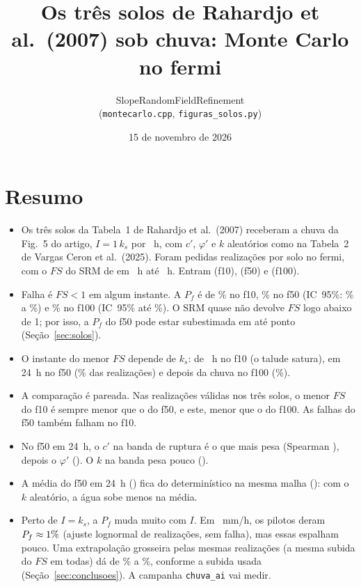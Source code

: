 \documentclass[11pt,a4paper]{article}
\author{SlopeRandomFieldRefinement\\ \small(\texttt{montecarlo.cpp}, \texttt{figuras\_solos.py})}
\title{Os três solos de Rahardjo et al.\ (2007) sob chuva: Monte Carlo no fermi}
\date{15 de novembro de 2026}
\begin{document}
\maketitle

\section*{Resumo}
\begin{itemize}
\item Os três solos da Tabela~1 de Rahardjo et al.\ (2007) receberam a chuva da Fig.~5 do artigo, $I = 1\,k_s$ por
\Chuva~h, com $c'$, $\varphi'$ e $k$ aleatórios como na Tabela~2 de Vargas Ceron et al.\ (2025). Foram pedidas
\NPlanDez{} realizações por solo no fermi, com o $FS$ do SRM de \Passo{} em \Passo~h até \Fim~h. Entram \NDez{} (f10),
\NCinquenta{} (f50) e \NCem{} (f100).
\item Falha é $FS < 1$ em algum instante. A $P_f$ é de \PfMinDez\% no f10, \PfMinCinquenta\% no f50 (IC~95\%:
\LoMinCinquenta\% a \HiMinCinquenta\%) e \PfMinCem\% no f100 (IC~95\% até \HiMinCem\%). O SRM quase não devolve $FS$
logo abaixo de 1; por isso, a $P_f$ do f50 pode estar subestimada em até \BuracoPontos{} ponto (Seção~\ref{sec:solos}).
\item O instante do menor $FS$ depende de $k_s$: de \QuandoFaixaDez~h no f10 (o talude satura), em 24~h no f50
(\QuandoPctCinquentaVinteQuatro\% das realizações) e depois da chuva no f100 (\DepoisPctCem\%).
\item A comparação é pareada. Nas \NComuns{} realizações válidas nos três solos, o menor $FS$ do f10 é sempre menor
que o do f50, e este, menor que o do f100. As \NfComunsCinquenta{} falhas do f50 também falham no f10.
\item No f50 em 24~h, o $c'$ na banda de ruptura é o que mais pesa (Spearman \RhoC), depois o $\varphi'$ (\RhoPhi). O
$k$ na banda pesa pouco (\RhoK).
\item A média do f50 em 24~h (\MediaCinquentaVinteQuatro) fica \PosCinquentaVinteQuatro{} do determinístico na mesma
malha (\DetCinquentaVinteQuatro): com o $k$ aleatório, a água sobe menos na média.
\item Perto de $I = k_s$, a $P_f$ muda muito com $I$. Em \Iref~mm/h, os pilotos deram $P_f \approx 1\%$
(ajuste lognormal de \NPiloto{} realizações, sem falha), mas essas \NPiloto{} espalham pouco. Uma extrapolação grosseira
pelas mesmas realizações (a mesma subida do $FS$ em todas) dá de \PfEstMin\% a \PfEstMax\%, conforme a subida usada
(Seção~\ref{sec:conclusoes}). A campanha \texttt{chuva\_ai} vai medir.
\end{itemize}
\end{document}
